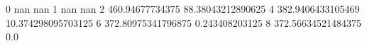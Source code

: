 0 nan nan
1 nan nan
2 460.94677734375 88.38043212890625
4 382.9406433105469 10.374298095703125
6 372.80975341796875 0.243408203125
8 372.56634521484375 0.0
